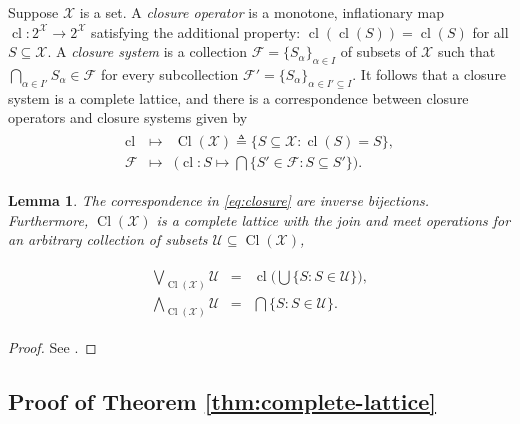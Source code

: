 \documentclass[conference]{ieeeconf}
\newcommand{\powerset}[1]{2^{#1}}
\newcommand{\X}{\mathcal{X}}
\newcommand{\F}{\mathcal{F}}
\newcommand{\U}{\mathcal{U}}
\newcommand{\bigjoin}{\bigvee}
\newcommand{\bigmeet}{\bigwedge}
\DeclareMathOperator{\cl}{cl}
\DeclareMathOperator{\Cl}{Cl}
\newtheorem{lemma}{Lemma}
\begin{document}
Suppose $\X$ is a set. A \emph{closure operator} is a monotone, inflationary map $\cl: \powerset{\X} \to \powerset{\X}$ satisfying the additional property: $\cl(\cl(S)) = \cl(S)$ for all $S \subseteq \X$. A \emph{closure system} is a collection $\F = \{S_{\alpha}\}_{\alpha \in I}$ of subsets of $\X$ such that $\bigcap_{\alpha \in I'} S_{\alpha} \in \F$ for every subcollection $\F' = \{S_{\alpha}\}_{\alpha \in I' \subseteq I}$. It follows that a closure system is a complete lattice, and there is a correspondence between closure operators and closure systems given by
\begin{align}
\begin{aligned}
    \cl &\mapsto& \Cl(\X) \triangleq \{ S \subseteq \X : \cl(S)=S \}, \\
          \F &\mapsto& \biggl( \cl: S \mapsto \bigcap  \{ S' \in \F : S \subseteq S' \} \biggr).
\end{aligned} \label{eq:closure}
\end{align}

\begin{lemma} \label{lem:joins-closure}
   The correspondence in \eqref{eq:closure} are inverse bijections. Furthermore, $\Cl(\X)$ is a complete lattice with the join and meet operations for an arbitrary collection of subsets $\U \subseteq \Cl(\X)$,
\end{lemma}
   \begin{align}
   \begin{aligned}
       \bigjoin_{\Cl(\X)} \U &=& \cl \biggl( \bigcup \{S: S \in \U\} \biggr), \\
       \bigmeet_{\Cl(\X)} \U &=& \bigcap \{S: S \in \U\}.
   \end{aligned} \label{eq:joins-closure}
   \end{align}
   
\begin{proof}
    See \cite[Theorem 3.7-3.8]{roman2008}.
\end{proof}

\vspace{-0.25em}
\subsection{Proof of Theorem \ref{thm:complete-lattice}}
\vspace{-0.25em}
\end{document}
